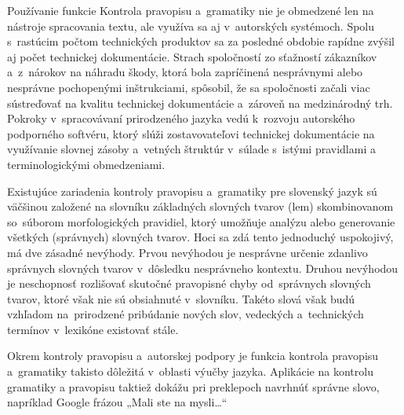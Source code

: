 \begin{multicols}{2}
Používanie funkcie Kontrola pravopisu a~gramatiky nie je obmedzené
len na nástroje spracovania textu, ale využíva sa aj
v~autorských systémoch. Spolu s~rastúcim počtom technických
produktov sa za posledné obdobie rapídne zvýšil aj počet technickej
dokumentácie. Strach spoločností zo sťažností zákazníkov
a~z~nárokov na náhradu škody, ktorá bola zapríčinená nesprávnymi
alebo nesprávne pochopenými inštrukciami, spôsobil, že sa
spoločnosti začali viac sústreďovať na kvalitu technickej
dokumentácie a~zároveň na medzinárodný trh. Pokroky
v~spracovávaní prirodzeného jazyka vedú k~rozvoju autorského
podporného softvéru, ktorý slúži zostavovateľovi technickej
dokumentácie na využívanie slovnej zásoby a~vetných štruktúr
v~súlade s~istými pravidlami a terminologickými
obmedzeniami.



Existujúce zariadenia kontroly pravopisu a~gramatiky pre slovenský
jazyk sú väčšinou založené na slovníku základných slovných
tvarov (lem) skombinovanom so~súborom morfologických pravidiel, ktorý
umožňuje analýzu alebo generovanie všetkých (správnych) slovných
tvarov. Hoci sa zdá tento jednoduchý uspokojivý, má dve
zásadné nevýhody. Prvou nevýhodou je nesprávne určenie zdanlivo
správnych slovných tvarov v~dôsledku nesprávneho kontextu. Druhou
nevýhodou je neschopnosť rozlišovať skutočné pravopisné chyby od~správnych slovných tvarov, ktoré však nie sú obsiahnuté
v~slovníku. Takéto slová však budú vzhľadom na~prirodzené
pribúdanie nových slov, vedeckých a~technických termínov
v~lexikóne existovať stále.

Okrem kontroly pravopisu a~autorskej podpory je funkcia kontrola
pravopisu a~gramatiky takisto dôležitá v~oblasti výučby jazyka. Aplikácie na kontrolu gramatiky a pravopisu taktiež dokážu pri preklepoch navrhnúť správne slovo, napríklad Google frázou „Mali ste na mysli\dots“


\end{multicols}
